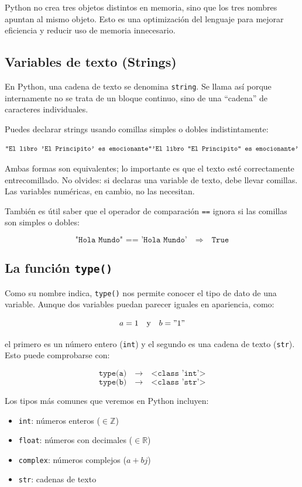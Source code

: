 \documentclass{article}
\theoremstyle{nonumberplain}
\begin{document}
Python no crea tres objetos distintos en memoria, sino que los tres nombres apuntan al mismo objeto. Esto es una optimización del lenguaje para mejorar eficiencia y reducir uso de memoria innecesario.

\subsection*{Variables de texto (Strings)}

En Python, una cadena de texto se denomina \texttt{string}. Se llama así porque internamente no se trata de un bloque continuo, sino de una “cadena” de caracteres individuales.

Puedes declarar strings usando comillas simples o dobles indistintamente:

\[
\texttt{"El libro 'El Principito' es emocionante"} \\
\texttt{'El libro "El Principito" es emocionante'}
\]

Ambas formas son equivalentes; lo importante es que el texto esté correctamente entrecomillado. No olvides: si declaras una variable de texto, debe llevar comillas. Las variables numéricas, en cambio, no las necesitan.

También es útil saber que el operador de comparación \texttt{==} ignora si las comillas son simples o dobles:

\[
\texttt{"Hola Mundo" == 'Hola Mundo'} \quad \Rightarrow \quad \texttt{True}
\]

\subsection*{La función \texttt{type()}}

Como su nombre indica, \texttt{type()} nos permite conocer el tipo de dato de una variable. Aunque dos variables puedan parecer iguales en apariencia, como:

\[
a = 1 \quad \text{y} \quad b = "1"
\]

el primero es un número entero (\texttt{int}) y el segundo es una cadena de texto (\texttt{str}). Esto puede comprobarse con:

\[
\texttt{type(a)} \quad → \quad \texttt{<class 'int'>}
\]
\[
\texttt{type(b)} \quad → \quad \texttt{<class 'str'>}
\]

Los tipos más comunes que veremos en Python incluyen:

\begin{itemize}
    \item \texttt{int}: números enteros ($\in \mathbb{Z}$)
    \item \texttt{float}: números con decimales ($\in \mathbb{R}$)
    \item \texttt{complex}: números complejos ($a + bj$)
    \item \texttt{str}: cadenas de texto
\end{itemize}
\end{document}
